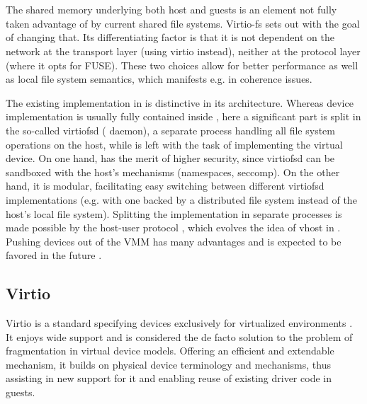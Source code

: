 \section{\viofs{}}

The shared memory underlying both host and guests is an element not fully taken
advantage of by current shared file systems. Virtio-fs \cite{virtiofs-website}
sets out with the goal of changing that. Its differentiating factor is that it
is not dependent on the network at the transport layer (using virtio instead),
neither at the protocol layer (where it opts for FUSE). These two choices allow
for better performance as well as local file system semantics, which manifests
e.g. in coherence issues.

The existing \viofs{} implementation in \qemu{} is distinctive in its
architecture. Whereas device implementation is usually fully contained inside
\qemu{}, here a significant part is split in the so-called virtiofsd (\viofs{}
daemon), a separate process handling all file system operations on the host,
while \qemu{} is left with the task of implementing the virtual device. On one
hand, has the merit of higher security, since virtiofsd can be sandboxed with
the host's mechanisms (namespaces, seccomp). On the other hand, it is modular,
facilitating easy switching between different virtiofsd implementations (e.g.
with one backed by a distributed file system instead of the host's local file
system). Splitting the implementation in separate processes is made possible by
the host-user protocol \cite{vhost-user}, which evolves the idea of vhost in
\qemu{} \cite{stefanha:vhost}. Pushing devices out of the VMM has many
advantages and is expected to be favored in the future
\cite{stefanha:out-of-process-dev}.

\subsection{Virtio}

Virtio is a standard specifying devices exclusively for virtualized environments
\cite{virtio}. It enjoys wide support and is considered the de facto solution
to the problem of fragmentation in virtual device models. Offering an efficient
and extendable mechanism, it builds on physical device terminology and
mechanisms, thus assisting in new support for it and enabling reuse of existing
driver code in guests.

